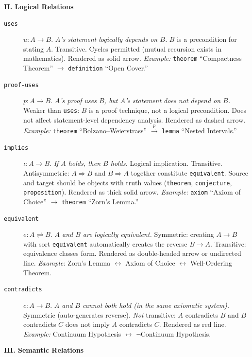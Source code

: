 \bigskip
\noindent\textbf{II. Logical Relations}

\begin{description}
\item[\texttt{uses}] $u: A \to B$. \emph{$A$'s statement logically depends on $B$.} $B$ is a precondition for stating $A$. Transitive. Cycles permitted (mutual recursion exists in mathematics). Rendered as solid arrow. \emph{Example:} \texttt{theorem} ``Compactness Theorem'' $\to$ \texttt{definition} ``Open Cover.''

\item[\texttt{proof-uses}] $p: A \to B$. \emph{$A$'s proof uses $B$, but $A$'s statement does not depend on $B$.} Weaker than \texttt{uses}: $B$ is a proof technique, not a logical precondition. Does not affect statement-level dependency analysis. Rendered as dashed arrow. \emph{Example:} \texttt{theorem} ``Bolzano--Weierstrass'' $\xrightarrow{p}$ \texttt{lemma} ``Nested Intervals.''

\item[\texttt{implies}] $\iota: A \to B$. \emph{If $A$ holds, then $B$ holds.} Logical implication. Transitive. Antisymmetric: $A \Rightarrow B$ and $B \Rightarrow A$ together constitute \texttt{equivalent}. Source and target should be objects with truth values (\texttt{theorem}, \texttt{conjecture}, \texttt{proposition}). Rendered as thick solid arrow. \emph{Example:} \texttt{axiom} ``Axiom of Choice'' $\to$ \texttt{theorem} ``Zorn's Lemma.''

\item[\texttt{equivalent}] $e: A \rightleftharpoons B$. \emph{$A$ and $B$ are logically equivalent.} Symmetric: creating $A \to B$ with sort \texttt{equivalent} automatically creates the reverse $B \to A$. Transitive: equivalence classes form. Rendered as double-headed arrow or undirected line. \emph{Example:} Zorn's Lemma $\leftrightarrow$ Axiom of Choice $\leftrightarrow$ Well-Ordering Theorem.

\item[\texttt{contradicts}] $c: A \to B$. \emph{$A$ and $B$ cannot both hold (in the same axiomatic system).} Symmetric (auto-generates reverse). \emph{Not} transitive: $A$ contradicts $B$ and $B$ contradicts $C$ does not imply $A$ contradicts $C$. Rendered as red line. \emph{Example:} Continuum Hypothesis $\leftrightarrow$ $\neg$Continuum Hypothesis.
\end{description}

\bigskip
\noindent\textbf{III. Semantic Relations}

